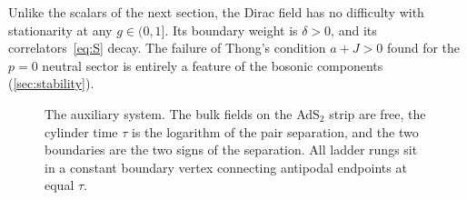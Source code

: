 Unlike the scalars of the next section, the Dirac field has no difficulty with stationarity at any $g\in(0,1]$. Its boundary weight is $\delta>0$, and its correlators~\eqref{eq:S} decay. The failure of Thong's condition $a+J>0$ found for the $p=0$ neutral sector is entirely a feature of the bosonic components (\cref{sec:stability}).

\begin{figure}[t]
\centering
{}
\caption{The auxiliary system. The bulk fields on the AdS$_2$ strip are free, the cylinder time $\tau$ is the logarithm of the pair separation, and the two boundaries are the two signs of the separation. All ladder rungs sit in a constant boundary vertex connecting antipodal endpoints at equal $\tau$.}
\label{fig:strip}
\end{figure}

